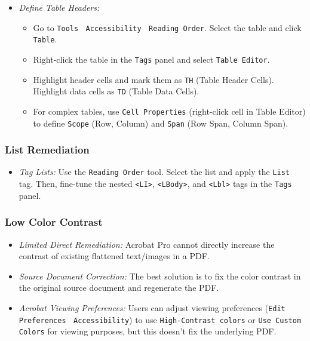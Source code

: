 \begin{itemize}
\item \emph{Define Table Headers:}
    \begin{itemize}
    \item Go to \texttt{Tools} $\>$ \texttt{Accessibility} $\>$ \texttt{Reading Order}. Select the table and click \texttt{Table}.
    \item Right-click the table in the \texttt{Tags} panel and select \texttt{Table Editor}.
    \item Highlight header cells and mark them as \texttt{TH} (Table Header Cells). Highlight data cells as \texttt{TD} (Table Data Cells).
    \item For complex tables, use \texttt{Cell Properties} (right-click cell in Table Editor) to define \texttt{Scope} (Row, Column) and \texttt{Span} (Row Span, Column Span).
    \end{itemize}
\end{itemize}

\subsubsection{List Remediation}
\label{subsubsec:list-remediation}
\begin{itemize}
\item \emph{Tag Lists:} Use the \texttt{Reading Order} tool. Select the list and apply the \texttt{List} tag. Then, fine-tune the nested \texttt{<LI>}, \texttt{<LBody>}, and \texttt{<Lbl>} tags in the \texttt{Tags} panel.
\end{itemize}
\subsubsection{Low Color Contrast}

\begin{itemize}
\item \emph{Limited Direct Remediation:} Acrobat Pro cannot directly increase the contrast of existing flattened text/images in a PDF.
\item \emph{Source Document Correction:} The best solution is to fix the color contrast in the original source document and regenerate the PDF.
\item \emph{Acrobat Viewing Preferences:} Users can adjust viewing preferences (\texttt{Edit} $\>$ \texttt{Preferences} $\>$ \texttt{Accessibility}) to use \texttt{High-Contrast colors} or \texttt{Use Custom Colors} for viewing purposes, but this doesn't fix the underlying PDF.
\end{itemize}

